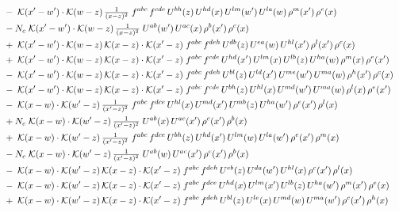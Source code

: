 \documentclass[10pt]{article}
\numberwithin{equation}{section}
\begin{document}
\begin{align}
&\quad -\;\mathcal{K}(x'-w')\cdot\mathcal{K}(w-z)\,\tfrac{1}{(x-z)^{2}}\;f^{abc}\,f^{cde}\,U^{bh}(z)\,U^{hd}(x)\,U^{lm}(w')\,U^{la}(w)\,\rho^{m}(x')\,\rho^{e}(x)\notag\\
&\quad -N_c\;\mathcal{K}(x'-w')\cdot\mathcal{K}(w-z)\,\tfrac{1}{(x-z)^{2}}\;U^{ab}(w')\,U^{ac}(x)\,\rho^{b}(x')\,\rho^{c}(x)\notag\\
&\quad +\;\mathcal{K}(x'-w')\cdot\mathcal{K}(w-z)\,\mathcal{K}(x-z)\cdot\mathcal{K}(x'-z)\;f^{abc}\,f^{deh}\,U^{db}(z)\,U^{ea}(w)\,U^{hl}(x')\,\rho^{l}(x')\,\rho^{c}(x)\notag\\
&\quad +\;\mathcal{K}(x'-w')\cdot\mathcal{K}(w-z)\,\mathcal{K}(x-z)\cdot\mathcal{K}(x'-z)\;f^{abc}\,f^{cde}\,U^{hd}(x')\,U^{lm}(x)\,U^{lb}(z)\,U^{ha}(w)\,\rho^{m}(x)\,\rho^{e}(x')\notag\\
&\quad -\;\mathcal{K}(x'-w')\cdot\mathcal{K}(w-z)\,\mathcal{K}(x-z)\cdot\mathcal{K}(x'-z)\;f^{abc}\,f^{deh}\,U^{bl}(z)\,U^{ld}(x')\,U^{me}(w')\,U^{ma}(w)\,\rho^{h}(x')\,\rho^{c}(x)\notag\\
&\quad -\;\mathcal{K}(x'-w')\cdot\mathcal{K}(w-z)\,\mathcal{K}(x-z)\cdot\mathcal{K}(x'-z)\;f^{abc}\,f^{cde}\,U^{bh}(z)\,U^{hl}(x)\,U^{md}(w')\,U^{ma}(w)\,\rho^{l}(x)\,\rho^{e}(x')\notag\\
&\quad -\;\mathcal{K}(x-w)\cdot\mathcal{K}(w'-z)\,\tfrac{1}{(x'-z)^{2}}\;f^{abc}\,f^{dce}\,U^{hl}(x)\,U^{md}(x')\,U^{mb}(z)\,U^{ha}(w')\,\rho^{e}(x')\,\rho^{l}(x)\notag\\
&\quad +N_c\;\mathcal{K}(x-w)\cdot\mathcal{K}(w'-z)\,\tfrac{1}{(x'-z)^{2}}\;U^{ab}(x)\,U^{ac}(x')\,\rho^{c}(x')\,\rho^{b}(x)\notag\\
&\quad +\;\mathcal{K}(x-w)\cdot\mathcal{K}(w'-z)\,\tfrac{1}{(x'-z)^{2}}\;f^{abc}\,f^{dce}\,U^{bh}(z)\,U^{hd}(x')\,U^{lm}(w)\,U^{la}(w')\,\rho^{e}(x')\,\rho^{m}(x)\notag\\
&\quad -N_c\;\mathcal{K}(x-w)\cdot\mathcal{K}(w'-z)\,\tfrac{1}{(x'-z)^{2}}\;U^{ab}(w)\,U^{ac}(x')\,\rho^{c}(x')\,\rho^{b}(x)\notag\\
&\quad -\;\mathcal{K}(x-w)\cdot\mathcal{K}(w'-z)\,\mathcal{K}(x-z)\cdot\mathcal{K}(x'-z)\;f^{abc}\,f^{deh}\,U^{eb}(z)\,U^{da}(w')\,U^{hl}(x)\,\rho^{c}(x')\,\rho^{l}(x)\notag\\
&\quad -\;\mathcal{K}(x-w)\cdot\mathcal{K}(w'-z)\,\mathcal{K}(x-z)\cdot\mathcal{K}(x'-z)\;f^{abc}\,f^{dce}\,U^{hd}(x)\,U^{lm}(x')\,U^{lb}(z)\,U^{ha}(w')\,\rho^{m}(x')\,\rho^{e}(x)\notag\\
&\quad +\;\mathcal{K}(x-w)\cdot\mathcal{K}(w'-z)\,\mathcal{K}(x-z)\cdot\mathcal{K}(x'-z)\;f^{abc}\,f^{deh}\,U^{bl}(z)\,U^{le}(x)\,U^{md}(w)\,U^{ma}(w')\,\rho^{c}(x')\,\rho^{h}(x)\notag\\

\end{align}
\end{document}
